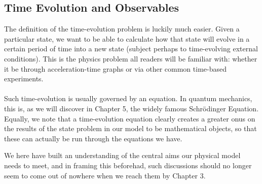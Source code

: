 \subsection*{Time Evolution and Observables}
The definition of the time-evolution problem is luckily much easier. Given a particular state, we want to be able to calculate how that state will evolve in a certain period of time into a new state (subject perhaps to time-evolving external conditions). This is the physics problem all readers will be familiar with: whether it be through acceleration-time graphs or via other common time-based experiments. 
\\\\
Such time-evolution is usually governed by an equation. In quantum mechanics, this is, as we will discover in Chapter 5, the widely famous Schr\"{o}dinger Equation. Equally, we note that a time-evolution equation clearly creates a greater onus on the results of the state problem in our model to be mathematical objects, so that these can actually be run through the equations we have.

We here have built an understanding of the central aims our physical model needs to meet, and in framing this beforehad, such discussions should no longer seem to come out of nowhere when we reach them by Chapter 3.
